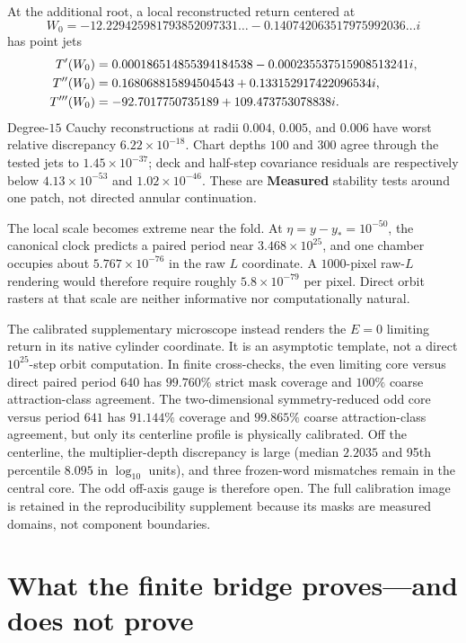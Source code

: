 \documentclass[11pt]{article}
\theoremstyle{definition}
\theoremstyle{remark}
\newcommand{\status}[1]{\textsf{\textbf{#1}}}
\begin{document}
At the additional root, a local reconstructed return centered at
\begin{equation}
  W_0=-12.229425981793852097331\ldots
      -0.140742063517975992036\ldots i
  \label{eq:W0}
\end{equation}
has point jets
\begin{align}
  T'(W_0)&=0.000186514855394184538
           -0.000235537515908513241i,\notag\\
  T''(W_0)&=0.168068815894504543
           +0.133152917422096534i,\notag\\
  T'''(W_0)&=-92.7017750735189+109.473753078838i.
  \label{eq:horn-jets}
\end{align}
Degree-$15$ Cauchy reconstructions at radii $0.004$, $0.005$, and $0.006$ have worst relative discrepancy $6.22\times10^{-18}$.  Chart depths $100$ and $300$ agree through the tested jets to $1.45\times10^{-37}$; deck and half-step covariance residuals are respectively below $4.13\times10^{-53}$ and $1.02\times10^{-46}$.  These are \status{Measured} stability tests around one patch, not directed annular continuation.

The local scale becomes extreme near the fold.  At $\eta=y-y_*=10^{-50}$, the canonical clock predicts a paired period near $3.468\times10^{25}$, and one chamber occupies about $5.767\times10^{-76}$ in the raw $L$ coordinate.  A $1000$-pixel raw-$L$ rendering would therefore require roughly $5.8\times10^{-79}$ per pixel.  Direct orbit rasters at that scale are neither informative nor computationally natural.

The calibrated supplementary microscope instead renders the $E=0$ limiting return in its native cylinder coordinate.  It is an asymptotic template, not a direct $10^{25}$-step orbit computation.  In finite cross-checks, the even limiting core versus direct paired period $640$ has $99.760\%$ strict mask coverage and $100\%$ coarse attraction-class agreement.  The two-dimensional symmetry-reduced odd core versus period $641$ has $91.144\%$ coverage and $99.865\%$ coarse attraction-class agreement, but only its centerline profile is physically calibrated.  Off the centerline, the multiplier-depth discrepancy is large (median $2.2035$ and 95th percentile $8.095$ in $\log_{10}$ units), and three frozen-word mismatches remain in the central core.  The odd off-axis gauge is therefore open.  The full calibration image is retained in the reproducibility supplement because its masks are measured domains, not component boundaries.

\section{What the finite bridge proves---and does not prove}
\end{document}
